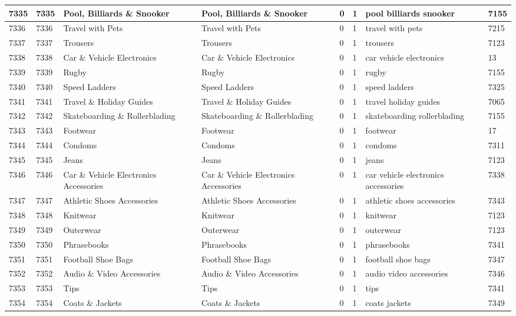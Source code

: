 \begin{longtable}{|l|l|l|l|l|l|l|l|}
7335 & 7335 & Pool, Billiards \& Snooker & Pool, Billiards \& Snooker & 0 & 1 & pool billiards snooker & 7155 \\ \hline 
7336 & 7336 & Travel with Pets & Travel with Pets & 0 & 1 & travel with pets & 7215 \\ \hline 
7337 & 7337 & Trousers & Trousers & 0 & 1 & trousers & 7123 \\ \hline 
7338 & 7338 & Car \& Vehicle Electronics & Car \& Vehicle Electronics & 0 & 1 & car vehicle electronics & 13 \\ \hline 
7339 & 7339 & Rugby & Rugby & 0 & 1 & rugby & 7155 \\ \hline 
7340 & 7340 & Speed Ladders & Speed Ladders & 0 & 1 & speed ladders & 7325 \\ \hline 
7341 & 7341 & Travel \& Holiday Guides & Travel \& Holiday Guides & 0 & 1 & travel holiday guides & 7065 \\ \hline 
7342 & 7342 & Skateboarding \& Rollerblading & Skateboarding \& Rollerblading & 0 & 1 & skateboarding rollerblading & 7155 \\ \hline 
7343 & 7343 & Footwear & Footwear & 0 & 1 & footwear & 17 \\ \hline 
7344 & 7344 & Condoms & Condoms & 0 & 1 & condoms & 7311 \\ \hline 
7345 & 7345 & Jeans & Jeans & 0 & 1 & jeans & 7123 \\ \hline 
7346 & 7346 & Car \& Vehicle Electronics Accessories & Car \& Vehicle Electronics Accessories & 0 & 1 & car vehicle electronics accessories & 7338 \\ \hline 
7347 & 7347 & Athletic Shoes Accessories & Athletic Shoes Accessories & 0 & 1 & athletic shoes accessories & 7343 \\ \hline 
7348 & 7348 & Knitwear & Knitwear & 0 & 1 & knitwear & 7123 \\ \hline 
7349 & 7349 & Outerwear & Outerwear & 0 & 1 & outerwear & 7123 \\ \hline 
7350 & 7350 & Phrasebooks & Phrasebooks & 0 & 1 & phrasebooks & 7341 \\ \hline 
7351 & 7351 & Football Shoe Bags & Football Shoe Bags & 0 & 1 & football shoe bags & 7347 \\ \hline 
7352 & 7352 & Audio \& Video Accessories & Audio \& Video Accessories & 0 & 1 & audio video accessories & 7346 \\ \hline 
7353 & 7353 & Tips & Tips & 0 & 1 & tips & 7341 \\ \hline 
7354 & 7354 & Coats \& Jackets & Coats \& Jackets & 0 & 1 & coats jackets & 7349 \\ \hline 

\end{longtable}
